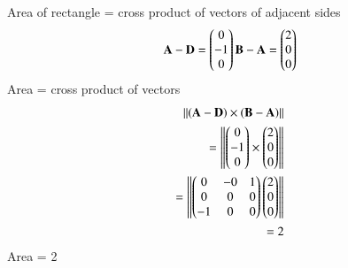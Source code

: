 Area of rectangle = cross product of vectors of adjacent sides
\begin{align}
    \mathbf{A} - \mathbf{D} = \begin{pmatrix}0 \\-1 \\0\end{pmatrix} 
    \mathbf{B} -\mathbf{A} = \begin{pmatrix}2 \\0 \\0\end{pmatrix}
\end{align}   
Area = cross product of vectors
\begin{align}
    \left\lVert(\mathbf{A}-\mathbf{D}) \times  (\mathbf{B}-\mathbf{A})\right\rVert   
    \\=\left\lVert\begin{pmatrix}0 \\-1 \\0\end{pmatrix}  \times \begin{pmatrix}2 \\0 \\0\end{pmatrix}\right\rVert 
    \\=\left\lVert\begin{pmatrix}0&-0&1 \\0&0&0 \\-1&0&0\end{pmatrix}  \begin{pmatrix}2 \\0 \\0\end{pmatrix}\right\rVert
    \\= 2
\end{align}
Area = 2 
